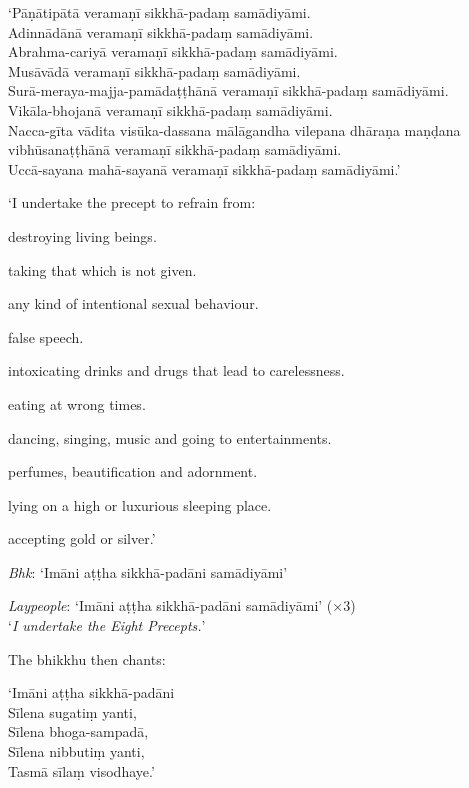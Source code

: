 ‘Pāṇātipātā veramaṇī sikkhā-padaṃ samādiyāmi.\\
Adinnādānā veramaṇī sikkhā-padaṃ samādiyāmi.\\
Abrahma-cariyā veramaṇī sikkhā-padaṃ samādiyāmi.\\
Musāvādā veramaṇī sikkhā-padaṃ samādiyāmi.\\
Surā-meraya-majja-pamādaṭṭhānā veramaṇī sikkhā-padaṃ samādiyāmi.\\
Vikāla-bhojanā veramaṇī sikkhā-padaṃ samādiyāmi.\\
Nacca-gīta vādita visūka-dassana mālāgandha vilepana dhāraṇa maṇḍana
vibhūsanaṭṭhānā veramaṇī sikkhā-padaṃ samādiyāmi.\\
Uccā-sayana mahā-sayanā veramaṇī sikkhā-padaṃ samādiyāmi.’


{\itshape

‘I undertake the precept to refrain from:

\begin{packeditemize}

\item destroying living beings.
\item taking that which is not given.
\item any kind of intentional sexual behaviour.
\item false speech.
\item intoxicating drinks and drugs that lead to carelessness.
\item eating at wrong times.
\item dancing, singing, music and going to entertainments.
\item perfumes, beautification and adornment.
\item lying on a high or luxurious sleeping place.
\item accepting gold or silver.’

\end{packeditemize}

}

\emph{Bhk}: ‘Imāni aṭṭha sikkhā-padāni samādiyāmi’

\emph{Laypeople}: ‘Imāni aṭṭha sikkhā-padāni samādiyāmi’ (×3)\\
‘\emph{I undertake the Eight Precepts.}’

The bhikkhu then chants:

‘Imāni aṭṭha sikkhā-padāni\\
Sīlena sugatiṃ yanti,\\
Sīlena bhoga-sampadā,\\
Sīlena nibbutiṃ yanti,\\
Tasmā sīlaṃ visodhaye.’

